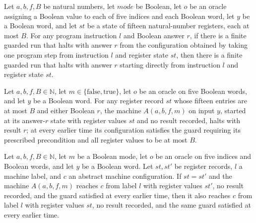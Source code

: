 \begin{lemma}
\label{Complexity.PathHard.stepH_of}
\leanok
{}
Let $a,b,f,B$ be natural numbers, let $mode$ be Boolean, let $o$ be an oracle assigning
a Boolean value to each of five indices and each Boolean word, let $y$ be a Boolean
word, and let $st$ be a state of fifteen natural-number registers, each at most $B$. For
any program instruction $l$ and Boolean answer $r$, if there is a finite guarded run
that halts with answer $r$ from the configuration obtained by taking one program step
from instruction $l$ and register state $st$, then there is a finite guarded run that
halts with answer $r$ starting directly from instruction $l$ and register state $st$.
\end{lemma}

\begin{lemma}
\label{Complexity.PathHard.ans_halt}
\leanok
{}
Let $a,b,f,B\in\mathbb{N}$, let $m\in\{\mathrm{false},\mathrm{true}\}$, let $o$ be an
oracle on five Boolean words, and let $y$ be a Boolean word. For any register record
$st$ whose fifteen entries are at most $B$ and either Boolean $r$, the machine
$A(a,b,f,m)$ on input $y$, started at its answer-$r$ state with register values $st$ and
no result recorded, halts with result $r$; at every earlier time its configuration
satisfies the guard requiring its prescribed precondition and all register values to be
at most $B$.
\end{lemma}

\begin{lemma}
\label{Complexity.PathHard.cont}
\leanok
{}
Let $a,b,f,B\in\mathbb{N}$, let $m$ be a Boolean mode, let $o$ be an oracle on five
indices and Boolean words, and let $y$ be a Boolean word. Let $st,st'$ be register
records, $l$ a machine label, and $c$ an abstract machine configuration. If $st=st'$ and
the machine $A(a,b,f,m)$ reaches $c$ from label $l$ with register values $st'$, no
result recorded, and the guard satisfied at every earlier time, then it also reaches $c$
from label $l$ with register values $st$, no result recorded, and the same guard
satisfied at every earlier time.
\end{lemma}

